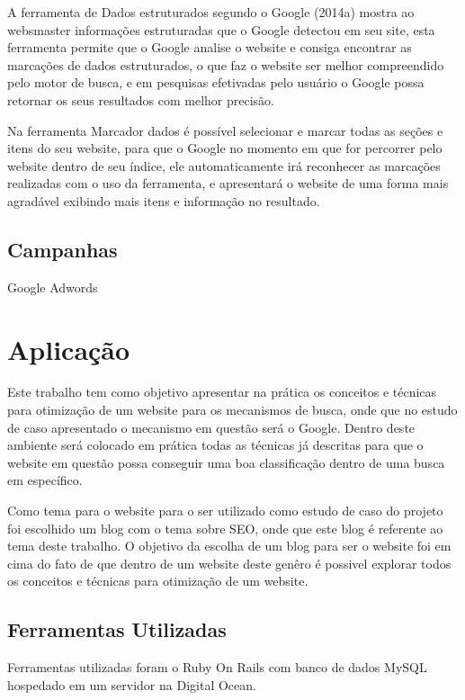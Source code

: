 \documentclass[
	12pt,				%
	openright,			%
	twoside,			%
	a4paper,			%
	english,			%
	french,				%
	spanish,			%
	brazil				%
	]{abntex2}
\begin{document}
A ferramenta de Dados estruturados segundo o Google (2014a) mostra ao websmaster informações estruturadas que o Google detectou em seu site, esta ferramenta permite que o Google analise o website e consiga encontrar as marcações de dados estruturados, o que faz o website ser melhor compreendido pelo motor de busca, e em pesquisas efetivadas pelo usuário o Google possa retornar os seus resultados com melhor precisão.

Na ferramenta Marcador dados é possível selecionar e marcar todas as seções e itens do seu website, para que o Google no momento em que for percorrer pelo website dentro de seu índice, ele automaticamente irá reconhecer as marcações realizadas com o uso da ferramenta, e apresentará o website de uma forma mais agradável exibindo mais itens e informação no resultado.

\section{Campanhas}

Google Adwords

\chapter{Aplicação}

Este trabalho tem como objetivo apresentar na prática os conceitos e técnicas para otimização de um website para os mecanismos de busca, onde que no estudo de caso apresentado o mecanismo em questão será o Google. Dentro deste ambiente será colocado em prática todas as técnicas já descritas para que o website em questão possa conseguir uma boa classificação dentro de uma busca em específico.

Como tema para o website para o ser utilizado como estudo de caso do projeto foi escolhido um blog com o tema sobre SEO, onde que este blog é referente ao tema deste trabalho. O objetivo da escolha de um blog para ser o website foi em cima do fato de que dentro de um website deste genêro é possivel explorar todos os conceitos e técnicas para otimização de um website.

\section{Ferramentas Utilizadas}

Ferramentas utilizadas foram o Ruby On Rails com banco de dados MySQL hospedado em um servidor na Digital Ocean.
\end{document}
